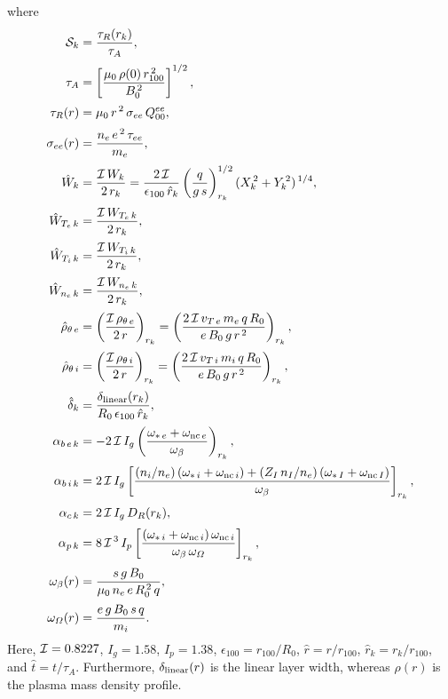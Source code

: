 \documentclass[notitlepage,12pt]{article}
\begin{document}
where
\begin{align}\label{e23}
{\cal S}_k&=\frac{\tau_R(r_k)}{\tau_A},\\[0.5ex]
\tau_A &= \left[\frac{\mu_0\,\rho(0)\,r_{100}^{\,2}}{B_0^{\,2}}\right]^{1/2},\\[0.5ex]
\tau_R(r) &= \mu_0\,r^{\,2}\,\sigma_{ee}\,Q_{00}^{ee},\\[0.5ex]
\sigma_{ee}(r) &=\frac{n_e\,e^{\,2}\,\tau_{ee}}{m_e},\\[0.5ex]
\hat{W}_k &=\frac{{\cal I}\,W_k}{2\,r_k}=\frac{2\,{\cal I}}{\epsilon_{100}\,\hat{r}_k}\left(\frac{q}{g\,s}\right)^{1/2}_{r_k} (X_k^{\,2} + Y_k^{\,2})^{\,1/4},\\[0.5ex]
\hat{W}_{T_e\,k} &=\frac{{\cal I}\,W_{T_e\,k}}{2\,r_k} ,\\[0.5ex]
\hat{W}_{T_i\,k} &= \frac{{\cal I}\,W_{T_i\,k}}{2\,r_k},\\[0.5ex]
\hat{W}_{n_e\,k} &= \frac{{\cal I}\,W_{n_e\,k}}{2\,r_k},\\[0.5ex]
\hat{\rho}_{\theta\,e} &= \left(\frac{{\cal I}\,\rho_{\theta\,e}}{2\,r}\right)_{r_k}=\left(\frac{2\,{\cal I}\,v_{T\,e}\,m_e\,q\,R_0}{e\,B_0\,g\,r^{\,2}}\right)_{r_k},\\[0.5ex]
\hat{\rho}_{\theta\,i} &= \left(\frac{{\cal I}\,\rho_{\theta\,i}}{2\,r}\right)_{r_k}= \left(\frac{2\,{\cal I}\,v_{T\,i}\,m_i\,q\,R_0}{e\,B_0\,g\,r^{\,2}}\right)_{r_k},\\[0.5ex]
\hat{\delta}_k &= \frac{\delta_{\rm linear}(r_k)}{R_0\,\epsilon_{100}\,\hat{r}_k},\\[0.5ex]
\alpha_{b\,e\,k} &= -2\,{\cal I}\,I_g\left(\frac{\omega_{\ast\,e}+\omega_{{\rm nc}\,e}}{\omega_\beta}\right)_{r_k},\\[0.5ex]
\alpha_{b\,i\,k} &= 2\,{\cal I}\,I_g\left[\frac{(n_i/n_e)\left(\omega_{\ast\,i}+\omega_{{\rm nc}\,i}\right)+(Z_I\,n_I/n_e)\left(\omega_{\ast\,I}+\omega_{{\rm nc}\,I}\right)}{\omega_\beta}\right]_{r_k},\\[0.5ex]
\alpha_{c\,k} &= 2\,{\cal I}\,I_g\,D_R(r_k),\\[0.5ex]
\alpha_{p\,k} &= 8\,{\cal I}^{\,3}\, I_p\left[\frac{(\omega_{\ast\,i}+\omega_{{\rm nc}\,i})\,\omega_{{\rm nc}\,i}}{\omega_\beta\,\omega_{\mit\Omega}}\right]_{r_k},\\[0.5ex]
\omega_{\beta}(r)&= \frac{s\,g\,B_0}{\mu_0\,n_e\,e\,R_0^{\,2}\,q},\\[0.5ex]
\omega_{\mit\Omega}(r)&= \frac{e\,g\,B_0\,s\,q}{m_i}.
\end{align}
Here, ${\cal I}=0.8227$, $I_g=1.58$, $I_p=1.38$, $\epsilon_{100}=r_{100}/R_0$, $\hat{r}=r/r_{100}$, $\hat{r}_k=r_k/r_{100}$, and $\hat{t}=t/\tau_A$. Furthermore, $\delta_{\rm linear}(r)$ is the linear layer width, whereas $\rho(r)$ is the plasma
mass density profile. 
\end{document}
